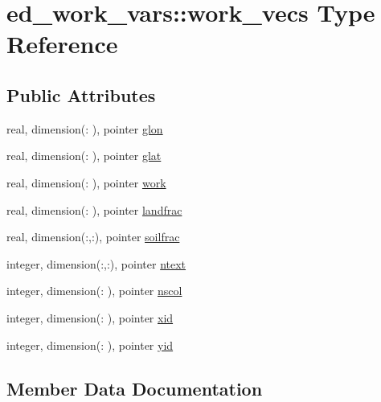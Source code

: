 \hypertarget{structed__work__vars_1_1work__vecs}{}\section{ed\+\_\+work\+\_\+vars\+:\+:work\+\_\+vecs Type Reference}
\label{structed__work__vars_1_1work__vecs}
\subsection*{Public Attributes}
\begin{DoxyCompactItemize}
\item 
real, dimension(\+: ), pointer \hyperlink{structed__work__vars_1_1work__vecs_abee061861a4c4f6dfbc1bc8ec18a463b}{glon}
\item 
real, dimension(\+: ), pointer \hyperlink{structed__work__vars_1_1work__vecs_a957e7ab559f48443828e710632887d48}{glat}
\item 
real, dimension(\+: ), pointer \hyperlink{structed__work__vars_1_1work__vecs_aa5dbf6c86b514fd72da0b0121693fcb9}{work}
\item 
real, dimension(\+: ), pointer \hyperlink{structed__work__vars_1_1work__vecs_a706bea04b2f0bd207bb88b24151b31f3}{landfrac}
\item 
real, dimension(\+:,\+:), pointer \hyperlink{structed__work__vars_1_1work__vecs_aaf7951b3fc6d10862e1a9110027766ea}{soilfrac}
\item 
integer, dimension(\+:,\+:), pointer \hyperlink{structed__work__vars_1_1work__vecs_a898272bb541b0bd262ff3efe1a0f919d}{ntext}
\item 
integer, dimension(\+: ), pointer \hyperlink{structed__work__vars_1_1work__vecs_abcd125ac3a76abc44387395c1746d25b}{nscol}
\item 
integer, dimension(\+: ), pointer \hyperlink{structed__work__vars_1_1work__vecs_afff01fc8dd99c5d3bbe9bbea9234381a}{xid}
\item 
integer, dimension(\+: ), pointer \hyperlink{structed__work__vars_1_1work__vecs_a456fdc2f1a35f3a46bab6d6affac952e}{yid}
\end{DoxyCompactItemize}


\subsection{Member Data Documentation}
\hypertarget{structed__work__vars_1_1work__vecs_a957e7ab559f48443828e710632887d48}{}

